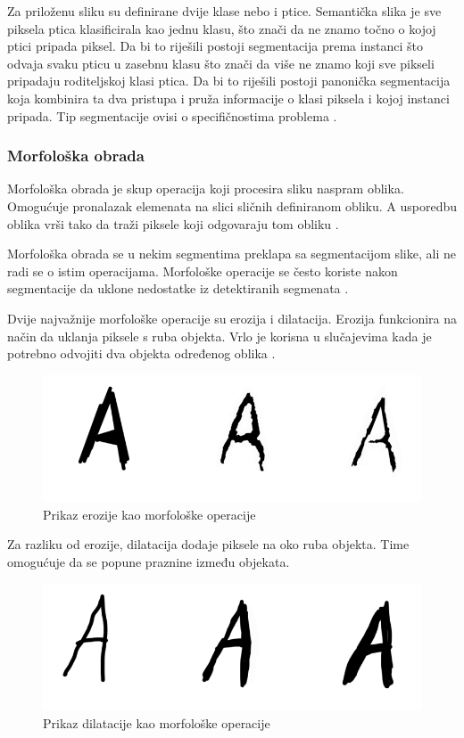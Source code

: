 \documentclass{foi}
\begin{document}
Za priloženu sliku su definirane dvije klase nebo i ptice. Semantička slika je sve piksela ptica klasificirala kao jednu klasu, što znači da ne znamo točno o kojoj ptici pripada piksel. Da bi to riješili postoji segmentacija prema instanci što odvaja svaku pticu u zasebnu klasu što znači da više ne znamo koji sve pikseli pripadaju roditeljskoj klasi ptica. Da bi to riješili postoji panonička segmentacija koja kombinira ta dva pristupa i pruža informacije o klasi piksela i kojoj instanci pripada. Tip segmentacije ovisi o specifičnostima problema \cite{segmentacija}.


\subsubsection{Morfološka obrada}

Morfološka obrada je skup operacija koji procesira sliku naspram oblika. Omogućuje pronalazak elemenata na slici sličnih definiranom obliku. A usporedbu oblika vrši tako da traži piksele koji odgovaraju tom obliku \cite{morph}.

Morfološka obrada se u nekim segmentima preklapa sa segmentacijom slike, ali ne radi se o istim operacijama. Morfološke operacije se često koriste nakon segmentacije da uklone nedostatke iz detektiranih segmenata \cite{morph}.

Dvije najvažnije morfološke operacije su erozija i dilatacija.
Erozija funkcionira na način da uklanja piksele s ruba objekta. Vrlo je korisna u slučajevima kada je potrebno odvojiti dva objekta određenog oblika \cite{morph}. 

\begin{figure}[H]
    \centering
    \includegraphics[width=0.75\linewidth]{slike/erosion.png}
    \caption{Prikaz erozije kao morfološke operacije \cite{morph}}
\end{figure}

Za razliku od erozije, dilatacija dodaje piksele na oko ruba objekta. Time omogućuje da se popune praznine između objekata.

\begin{figure}[H]
    \centering
    \includegraphics[width=0.75\linewidth]{slike/dilatacija.png}
    \caption{Prikaz dilatacije kao morfološke operacije \cite{morph}}
\end{figure}
\end{document}

